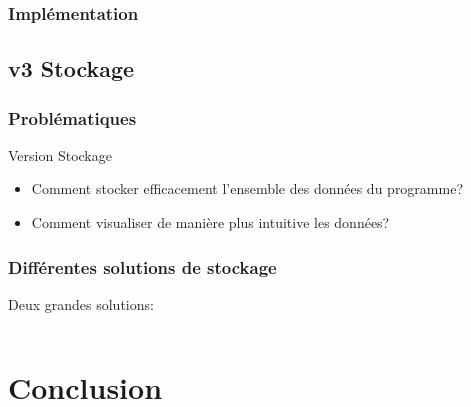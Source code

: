 \documentclass{beamer}
\begin{document}
            \begin{frame}
                \frametitle{Implémentation}
            \end{frame}
        \subsection{v3 Stockage}
            \begin{frame}
                \frametitle{Problématiques}
                Version Stockage 
                \pause
                \begin{itemize}
                    \item Comment stocker efficacement l'ensemble des données du programme?
                    \pause
                    \item Comment visualiser de manière plus intuitive les données?
                \end{itemize}
            \end{frame}
            \begin{frame}
                \frametitle{Différentes solutions de stockage}
                Deux grandes solutions:
                \pause
                \begin{columns}
                    \begin{column}{4cm}
                        \begin{block}{}
                        \end{block}
                    \end{column}
                \end{columns}
            \end{frame}

    \section{Conclusion}
        \begin{frame}
        \end{frame}
\end{document}
